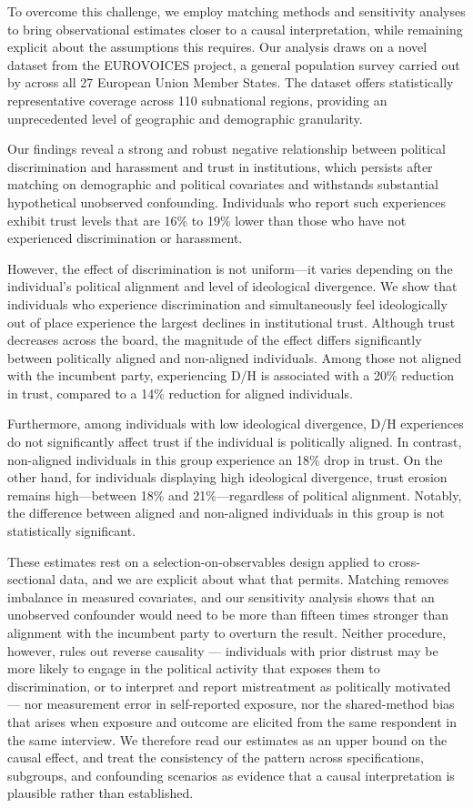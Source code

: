 \documentclass{article}
\begin{document}
To overcome this challenge, we employ matching methods and sensitivity analyses to bring observational estimates closer to a causal interpretation, while remaining explicit about the assumptions this requires. Our analysis draws on a novel dataset from the EUROVOICES project, a general population survey carried out by \textcite{the_world_justice_project} across all 27 European Union Member States. The dataset offers statistically representative coverage across 110 subnational regions, providing an unprecedented level of geographic and demographic granularity.

Our findings reveal a strong and robust negative relationship between political discrimination and harassment and trust in institutions, which persists after matching on demographic and political covariates and withstands substantial hypothetical unobserved confounding. Individuals who report such experiences exhibit trust levels that are 16\% to 19\% lower than those who have not experienced discrimination or harassment.

However, the effect of discrimination is not uniform—it varies depending on the individual's political alignment and level of ideological divergence. We show that individuals who experience discrimination and simultaneously feel ideologically out of place experience the largest declines in institutional trust. Although trust decreases across the board, the magnitude of the effect differs significantly between politically aligned and non-aligned individuals. Among those not aligned with the incumbent party, experiencing D/H is associated with a 20\% reduction in trust, compared to a 14\% reduction for aligned individuals.

Furthermore, among individuals with low ideological divergence, D/H experiences do not significantly affect trust if the individual is politically aligned. In contrast, non-aligned individuals in this group experience an 18\% drop in trust. On the other hand, for individuals displaying high ideological divergence, trust erosion remains high—between 18\% and 21\%—regardless of political alignment. Notably, the difference between aligned and non-aligned individuals in this group is not statistically significant.

These estimates rest on a selection-on-observables design applied to cross-sectional data, and we are explicit about what that permits. Matching removes imbalance in measured covariates, and our sensitivity analysis shows that an unobserved confounder would need to be more than fifteen times stronger than alignment with the incumbent party to overturn the result. Neither procedure, however, rules out reverse causality — individuals with prior distrust may be more likely to engage in the political activity that exposes them to discrimination, or to interpret and report mistreatment as politically motivated — nor measurement error in self-reported exposure, nor the shared-method bias that arises when exposure and outcome are elicited from the same respondent in the same interview. We therefore read our estimates as an upper bound on the causal effect, and treat the consistency of the pattern across specifications, subgroups, and confounding scenarios as evidence that a causal interpretation is plausible rather than established.
\end{document}
